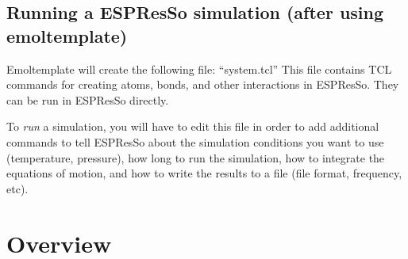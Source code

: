 \documentclass[11pt]{article}
\begin{document}


\subsection{Running a ESPResSo simulation (after using emoltemplate)}
\label{sec:run}
Emoltemplate will create the following file: 
``system.tcl''
This file contains TCL commands 
for creating atoms, bonds, and other interactions in ESPResSo.
They can be run in ESPResSo directly.

To \textit{run} a simulation, you will have to 
edit this file in order to add additional
commands to tell ESPResSo about the simulation conditions
you want to use (temperature, pressure), 
how long to run the simulation,
how to integrate the equations of motion,
and how to write the results to a file (file format, frequency, etc).

\pagebreak
\section{Overview}
\end{document}
